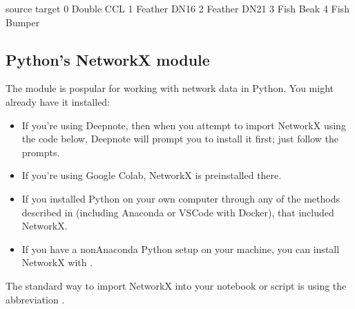 \documentclass[letterpaper,10pt,english]{jupyterBook}
\begin{document}
\begin{sphinxVerbatim}[commandchars=\\\{\}]
    source  target
0   Double     CCL
1  Feather    DN16
2  Feather    DN21
3     Fish    Beak
4     Fish  Bumper
\end{sphinxVerbatim}


\subsection{Python’s NetworkX module}
\label{\detokenize{chapter-15-networks:python-s-networkx-module}}
\sphinxAtStartPar
The  module is pospular for working with network data in Python.  You might already have it installed:
\begin{itemize}
\item {} 
\sphinxAtStartPar
If you’re using Deepnote, then when you attempt to import NetworkX using the code below, Deepnote will prompt you to install it first; just follow the prompts.

\item {} 
\sphinxAtStartPar
If you’re using Google Colab, NetworkX is pre\sphinxhyphen{}installed there.

\item {} 
\sphinxAtStartPar
If you installed Python on your own computer through any of the methods described in {\hyperref[\detokenize{chapter-3-jupyter::doc}]{}} (including Anaconda or VSCode with Docker), that included NetworkX.

\item {} 
\sphinxAtStartPar
If you have a non\sphinxhyphen{}Anaconda Python setup on your machine, you can install NetworkX with .

\end{itemize}

\sphinxAtStartPar
The standard way to import NetworkX into your notebook or script is using the abbreviation .

\begin{sphinxVerbatim}[commandchars=\\\{\}]
   
\end{sphinxVerbatim}
\end{document}
